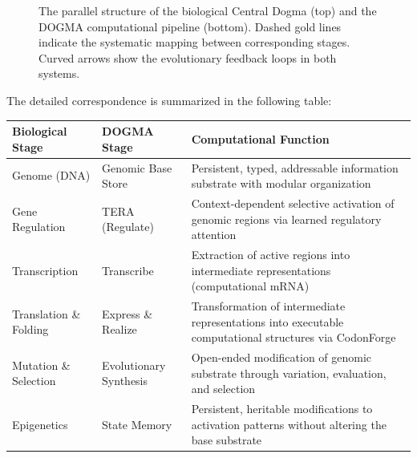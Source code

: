 \begin{figure}[ht]
\caption{The parallel structure of the biological Central Dogma (top) and the DOGMA computational pipeline (bottom). Dashed gold lines indicate the systematic mapping between corresponding stages. Curved arrows show the evolutionary feedback loops in both systems.}
\label{fig:dogma-pipeline-mapping}
\end{figure}

The detailed correspondence is summarized in the following table:

\begin{center}
\renewcommand{\arraystretch}{1.3}
\begin{tabular}{p{3.2cm} p{3cm} p{6.5cm}}
\toprule
\textbf{Biological Stage} & \textbf{DOGMA Stage} & \textbf{Computational Function} \\
\midrule
Genome (DNA) & Genomic Base Store & Persistent, typed, addressable information substrate with modular organization \\
Gene Regulation & TERA (Regulate) & Context-dependent selective activation of genomic regions via learned regulatory attention \\
Transcription & Transcribe & Extraction of active regions into intermediate representations (computational mRNA) \\
Translation \& Folding & Express \& Realize & Transformation of intermediate representations into executable computational structures via CodonForge \\
Mutation \& Selection & Evolutionary Synthesis & Open-ended modification of genomic substrate through variation, evaluation, and selection \\
Epigenetics & State Memory & Persistent, heritable modifications to activation patterns without altering the base substrate \\
\bottomrule
\end{tabular}
\end{center}

